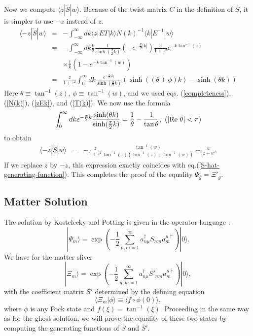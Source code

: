 \documentclass[a4paper,12pt]{article}
\begin{document}
Now we compute $\langle z|\widetilde{S}|w\rangle$.
Because of the twist matrix $C$ in the definition of $S$,
it is simpler to use $-z$ instead of $z$.
\begin{eqnarray}
\langle -z|\widetilde{S}|w\rangle&=&
-\int_{-\infty}^{\infty}dk\langle z|ET|k\rangle  N(k)^{-1}
\langle k|E^{-1}|w\rangle \nonumber \\
&=&-\int_{-\infty}^{\infty}dk\frac{k}{2}\frac{1}{\sinh(\frac{\pi}{2}k)}
(-e^{-\frac{\pi}{2}|k|})
\frac{z}{1+z^2}e^{-k\tan^{-1}(z)} \nonumber\\
& &\times
\frac{1}{k}(1-e^{-k\tan^{-1}(w)}) \nonumber\\
&=&\frac{z}{1+z^2}\int_{0}^{\infty}dk
\frac{e^{-\frac{\pi}{2}|k|}}{\sinh(\frac{\pi}{2}k)}
\left( \sinh((\theta+\phi)k) -\sinh(\theta k)\right)
\end{eqnarray}
Here $\theta\equiv \tan^{-1}(z)$, $\phi \equiv \tan^{-1}(w)$,
and we used eqs. (\ref{completeness}), (\ref{N(k)}), (\ref{zEk}),
and (\ref{T(k)}).
We now use the formula
\begin{equation}\label{good-formula}
\int_0^{\infty}dk e^{-\frac{\pi}{2}k}\frac{\sinh(\theta k)}{\sinh(\frac{\pi}{2}k)}
=\frac{1}{\theta} -\frac{1}{\tan\theta},~
(|{\rm Re} ~\theta|<\pi)
\end{equation}
to obtain
\begin{eqnarray}\label{-z-widetilde-S}
\langle -z|\widetilde{S}|w\rangle &=&
-\frac{z}{1+z^2}\frac{\tan^{-1}(w)}{\tan^{-1}(z)(\tan^{-1}(z)+\tan^{-1}(w))}+\frac{w}{z+w}.
\end{eqnarray}
If we replace $z$ by $-z$, this expression exactly coincides with
eq.(\ref{S-hat-generating-function}).
This completes the proof of the equality $\Psi_g=\Xi'_g$.
\subsection{Matter Solution}

The solution by Kostelecky and Potting is given in the operator
language \cite{Kostelecky-Potting}:
\begin{equation}
|\Psi_m \rangle = \exp\left (-\frac{1}{2}\sum_{n,m=1}^{\infty}
a_{n\mu}^{\dagger} S_{nm} a_{m}^{\mu\dagger} \right)|0\rangle.
\end{equation}
We have for the matter sliver \cite{RSZclassical}
\begin{equation}
|\Xi_m \rangle = \exp\left (-\frac{1}{2}\sum_{n,m=1}^{\infty}
a_{n\mu}^{\dagger} S'_{nm} a_{m}^{\mu\dagger} \right)|0\rangle,
\end{equation}
with the coefficient matrix $S'$ determined by the defining equation
\cite{RSZboundary}
\begin{equation}
\langle \Xi_m |\phi \rangle \equiv \langle f \circ \phi(0)
\rangle,
\end{equation}
where $\phi$ is any Fock state and $f(\xi) = \tan^{-1}(\xi)$.
Proceeding in the same way as for the ghost solution,
we will prove the equality of these two states by computing
the generating functions of $S$ and $S'$.
\end{document}
